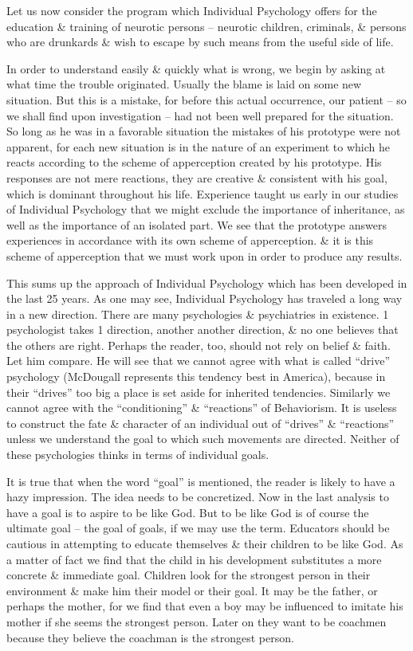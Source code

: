 \documentclass{article}
\numberwithin{equation}{section}
\begin{document}
Let us now consider the program which Individual Psychology offers for the education \& training of neurotic persons -- neurotic children, criminals, \& persons who are drunkards \& wish to escape by such means from the useful side of life.

In order to understand easily \& quickly what is wrong, we begin by asking at what time the trouble originated. Usually the blame is laid on some new situation. But this is a mistake, for before this actual occurrence, our patient -- so we shall find upon investigation -- had not been well prepared for the situation. So long as he was in a favorable situation the mistakes of his prototype were not apparent, for each new situation is in the nature of an experiment to which he reacts according to the scheme of apperception created by his prototype. His responses are not mere reactions, they are creative \& consistent with his goal, which is dominant throughout his life. Experience taught us early in our studies of Individual Psychology that we might exclude the importance of inheritance, as well as the importance of an isolated part. We see that the prototype answers experiences in accordance with its own scheme of apperception. \& it is this scheme of apperception that we must work upon in order to produce any results.

This sums up the approach of Individual Psychology which has been developed in the last 25 years. As one may see, Individual Psychology has traveled a long way in a new direction. There are many psychologies \& psychiatries in existence. 1 psychologist takes 1 direction, another another direction, \& no one believes that the others are right. Perhaps the reader, too, should not rely on belief \& faith. Let him compare. He will see that we cannot agree with what is called ``drive'' psychology (McDougall represents this tendency best in America), because in their ``drives'' too big a place is set aside for inherited tendencies. Similarly we cannot agree with the ``conditioning'' \& ``reactions'' of Behaviorism. It is useless to construct the fate \& character of an individual out of ``drives'' \& ``reactions'' unless we understand the goal to which such movements are directed. Neither of these psychologies thinks in terms of individual goals.

It is true that when the word ``goal'' is mentioned, the reader is likely to have a hazy impression. The idea needs to be concretized. Now in the last analysis to have a goal is to aspire to be like God. But to be like God is of course the ultimate goal -- the goal of goals, if we may use the term. Educators should be cautious in attempting to educate themselves \& their children to be like God. As a matter of fact we find that the child in his development substitutes a more concrete \& immediate goal. Children look for the strongest person in their environment \& make him their model or their goal. It may be the father, or perhaps the mother, for we find that even a boy may be influenced to imitate his mother if she seems the strongest person. Later on they want to be coachmen because they believe the coachman is the strongest person.
\end{document}

